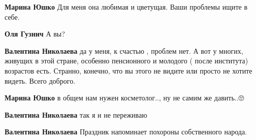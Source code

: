 \begin{itemize}
\begin{itemize}
\textbf{Марина Юшко} Для меня она любимая и цветущая. Ваши проблемы ищите в себе.

 
\textbf{Оля Гузнич} А вы?

 
\textbf{Валентина Николаева} да у меня, к счастью , проблем нет. А вот у многих, живущих в этой стране, особенно пенсионного и молодого ( после института) возрастов есть. Странно, конечно, что вы этого не видите или просто не хотите видеть. Всего доброго.

 
\textbf{Марина Юшко} в общем нам нужен косметолог.., ну не самим же давить..🙄🤔

 
\textbf{Валентина Николаева} так я и не переживаю

 
\textbf{Валентина Николаева} Праздник напоминает похороны собственного народа.

 

\end{itemize}
\end{itemize}
